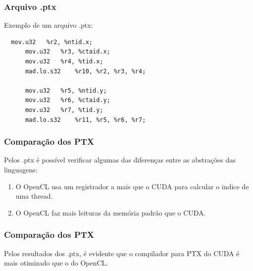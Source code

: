 \documentclass[brazil]{beamer}
\begin{document}

\begin{frame}[fragile]
  \frametitle{Arquivo .ptx}
  Exemplo de um arquivo .ptx:
  \begin{lstlisting}
  mov.u32 	%r2, %ntid.x;
	  mov.u32 	%r3, %ctaid.x;
	  mov.u32 	%r4, %tid.x;
	  mad.lo.s32 	%r10, %r2, %r3, %r4;
	  
	  mov.u32 	%r5, %ntid.y;
	  mov.u32 	%r6, %ctaid.y;
	  mov.u32 	%r7, %tid.y;
	  mad.lo.s32 	%r11, %r5, %r6, %r7;
  \end{lstlisting}
\end{frame}

\begin{frame}[fragile]
  \frametitle{Comparação dos PTX}
  Pelos .ptx é possível verificar algumas das diferenças entre as abstrações das linguagens:
  \begin{enumerate}
    \item O OpenCL usa um registrador a mais que o CUDA para calcular o indice de uma thread.
    \item O OpenCL faz mais leituras da memória padrão que o CUDA. 
  \end{enumerate}
\end{frame}

\begin{frame}
  \frametitle{Comparação dos PTX}
  Pelos resultados dos .ptx, é evidente que o compilador para PTX do CUDA é mais otimizado que o do OpenCL. \\
\end{frame}
\end{document}
